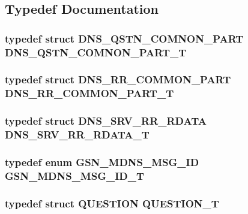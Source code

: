 \subsection{Typedef Documentation}
\hypertarget{a00526_a8ac066089aff8c4b88aeb4dca6500e7d}{
\subsubsection[{DNS\_\-QSTN\_\-COMNON\_\-PART\_\-T}]{\setlength{\rightskip}{0pt plus 5cm}typedef struct {\bf DNS\_\-QSTN\_\-COMNON\_\-PART} {\bf DNS\_\-QSTN\_\-COMNON\_\-PART\_\-T}}}
\label{a00526_a8ac066089aff8c4b88aeb4dca6500e7d}
\hypertarget{a00526_a7a61e300572a2dbc5c7694b9975e977f}{
\subsubsection[{DNS\_\-RR\_\-COMMON\_\-PART\_\-T}]{\setlength{\rightskip}{0pt plus 5cm}typedef struct {\bf DNS\_\-RR\_\-COMMON\_\-PART} {\bf DNS\_\-RR\_\-COMMON\_\-PART\_\-T}}}
\label{a00526_a7a61e300572a2dbc5c7694b9975e977f}
\hypertarget{a00526_a5a120225d78963b53675c5e27686c7ab}{
\subsubsection[{DNS\_\-SRV\_\-RR\_\-RDATA\_\-T}]{\setlength{\rightskip}{0pt plus 5cm}typedef struct {\bf DNS\_\-SRV\_\-RR\_\-RDATA} {\bf DNS\_\-SRV\_\-RR\_\-RDATA\_\-T}}}
\label{a00526_a5a120225d78963b53675c5e27686c7ab}
\hypertarget{a00526_a04683c3770745c022dfa21c6317456a9}{
\subsubsection[{GSN\_\-MDNS\_\-MSG\_\-ID\_\-T}]{\setlength{\rightskip}{0pt plus 5cm}typedef enum {\bf GSN\_\-MDNS\_\-MSG\_\-ID} {\bf GSN\_\-MDNS\_\-MSG\_\-ID\_\-T}}}
\label{a00526_a04683c3770745c022dfa21c6317456a9}
\hypertarget{a00526_a765e95a4adbd8d8a442ce10d731e9f7e}{
\subsubsection[{QUESTION\_\-T}]{\setlength{\rightskip}{0pt plus 5cm}typedef struct {\bf QUESTION} {\bf QUESTION\_\-T}}}
\label{a00526_a765e95a4adbd8d8a442ce10d731e9f7e}


